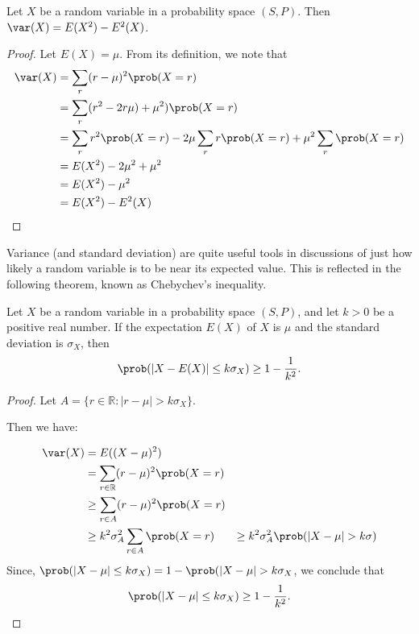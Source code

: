 \begin{proposition}\label{prop:altvar}
Let $X$ be a random variable in a probability space $(S,P)$.
Then $\var(X)= E(X^2)-E^2(X)$.
\end{proposition}
\begin{proof}
Let $E(X)=\mu$.  From its definition, we note that
\begin{align*}
 \var(X) &= \sum_{r} (r -\mu)^2\prob(X=r)\\
         &= \sum_{r} (r^2 -2r \mu)+\mu^2)\prob(X=r)\\
         &= \sum_r r^2\prob(X=r) - 2 \mu\sum_r r\prob(X=r) +\mu^2\sum_r\prob(X=r)\\
         &= E(X^2) -2\mu^2+\mu^2\\
         &= E(X^2) - \mu^2\\
         &= E(X^2) - E^2(X)
\end{align*}
\end{proof}

Variance (and standard deviation) are quite useful tools in discussions of 
just how likely a random variable is to be near its expected value.
This is reflected in the following theorem, known as Chebychev's
inequality.

\begin{theorem}
Let $X$ be a random variable in a probability space $(S,P)$, and
let $k>0$ be a positive real number.  If the expectation $E(X)$ of
$X$ is $\mu$ and the standard deviation is $\sigma_X$, then
\[
\prob(|X- E(X)|\le k\sigma_X)\ge 1-\frac{1}{k^2}.
\]
\end{theorem}
\begin{proof}
Let $A=\{r\in \mathbb{R}:|r-\mu|>k\sigma_X\}$.

Then we have:

\begin{align*}
\var(X) &= E((X-\mu)^2)\\
        &= \sum_{r\in \mathbb{R}}(r-\mu)^2\prob(X=r)\\
        &\ge \sum_{r\in A}(r-\mu)^2\prob(X=r)\\
        &\ge k^2\sigma_A^2\sum_{r\in A}\prob(X=r)
        &\ge k^2\sigma_A^2\prob(|X-\mu|>k\sigma)\\
\end{align*}
Since, $\prob(|X-\mu|\le k\sigma_X)=1-\prob(|X-\mu|> k\sigma_X$,
we conclude that 
\[
\prob(|X- \mu|\le k\sigma_X)\ge 1-\frac{1}{k^2}.
\]
\end{proof}

